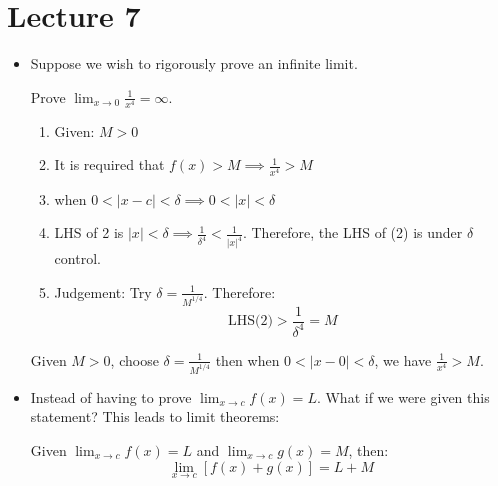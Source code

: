 \section{Lecture 7}
\begin{itemize}
    \item Suppose we wish to rigorously prove an infinite limit.
    \begin{example}
        Prove $\displaystyle\lim_{x\to 0}\frac{1}{x^4}=\infty$.
        \begin{enumerate}
            \item Given: $M>0$
            \item It is required that $f(x)>M \implies \frac{1}{x^4} > M$
            \item when $0<|x-c|<\delta \implies 0<|x|<\delta$
            \item LHS of 2 is $|x|<\delta \implies \frac{1}{\delta^4} < \frac{1}{|x|^4}$. Therefore, the LHS of (2) is under $\delta$ control.
            \item Judgement: Try $\delta=\frac{1}{M^{1/4}}$. Therefore:
            \begin{equation}
                \text{LHS(2)} > \frac{1}{\delta^4} = M
                \label{eq:}
            \end{equation}
        \end{enumerate}
        Given $M>0$, choose $\delta=\frac{1}{M^{1/4}}$ then when $0<|x-0|<\delta$, we have $\frac{1}{x^4}>M$.
    \end{example}
    \item Instead of having to prove $\displaystyle \lim_{x\to c} f(x)=L$. What if we were given this statement? This leads to limit theorems:
    \begin{theorem}
        Given $\displaystyle\lim_{x\to c}f(x)=L$ and $\displaystyle\lim_{x\to c}g(x)=M$, then:
        \begin{equation}
            \lim_{x\to c}\left[f(x)+g(x)\right]=L+M
            \label{eq:}
        \end{equation}
        

\end{theorem}
\end{itemize}
